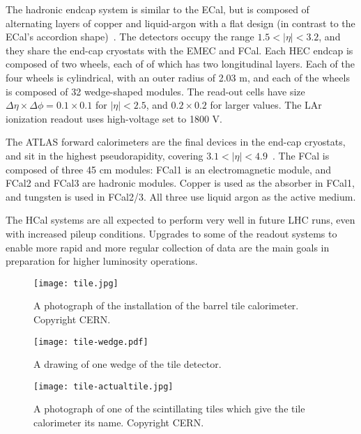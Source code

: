 The hadronic endcap system is similar to the ECal, but is composed of alternating layers of copper and liquid-argon with a flat design (in contrast to the ECal's accordion shape)~\cite{ATLASPaper}. The detectors occupy the range $1.5 < |\eta| < 3.2$, and they share the end-cap cryostats with the EMEC and FCal.  Each HEC endcap is composed of two wheels, each of of which has two longitudinal layers. Each of the four wheels is cylindrical, with an outer radius of 2.03 m, and each of the wheels is composed of 32 wedge-shaped modules. The read-out cells have size $\Delta \eta \times \Delta\phi = 0.1 \times 0.1$ for $|\eta| < 2.5$, and $0.2 \times 0.2$ for larger values. The LAr ionization readout uses high-voltage set to 1800 V.

The ATLAS forward calorimeters are the final devices in the end-cap cryostats, and sit in the highest pseudorapidity, covering $3.1 < |\eta| < 4.9$~\cite{ATLASPaper}. The FCal is composed of three 45 cm modules: FCal1 is an electromagnetic module, and FCal2 and FCal3 are hadronic modules. Copper is used as the absorber in FCal1, and tungsten is used in FCal2/3. All three use liquid argon as the active medium.

The HCal systems are all expected to perform very well in future LHC runs, even with increased pileup conditions. Upgrades to some of the readout systems to enable more rapid and more regular collection of data are the main goals in preparation for higher luminosity operations.



\begin{figure}
\centering
\texttt{[image: tile.jpg]}
\label{fig:detector:barrel-tile}
\caption{A photograph of the installation of the barrel tile calorimeter. Copyright CERN.}
\end{figure}



\begin{figure}
\centering
\texttt{[image: tile-wedge.pdf]}
\label{fig:detector:tile-wedge}
\caption{A drawing of one wedge of the tile detector.}
\end{figure}



\begin{figure}
\centering
\texttt{[image: tile-actualtile.jpg]}
\label{fig:detector:actualtile}
\caption{A photograph of one of the scintillating tiles which give the tile calorimeter its name. Copyright CERN.}
\end{figure}

